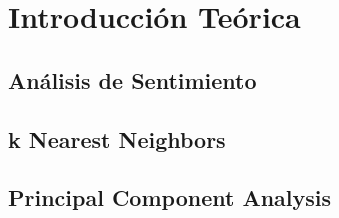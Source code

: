 \section{Introducción Teórica}%
\label{sec:introduccion_teorica}

\subsection{Análisis de Sentimiento}%
\label{sub:analisis_de_sentimiento}

\subsection{k Nearest Neighbors}%
\label{sub:k_nearest_neighbors}

\subsection{Principal Component Analysis}%
\label{sub:principal_component_analysis}
